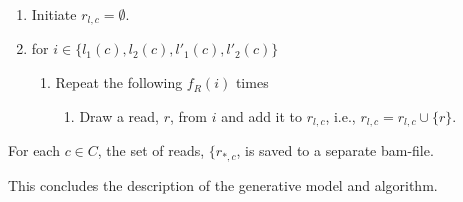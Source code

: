 \documentclass[a4paper,11pt]{article}
\begin{document}
\begin{enumerate}
\item Initiate $r_{l,c}=\emptyset$.
\item for $i\in \{l_1(c),l_2(c),l'_1(c),l'_2(c)\}$
  \begin{enumerate}
  \item Repeat the following $f_R(i)$ times
    \begin{enumerate}
    \item Draw a read, $r$, from $i$ and add it to $r_{l,c}$, i.e., $r_{l,c}=r_{l,c}\cup \{r\}$.
    \end{enumerate}
  \end{enumerate}
\end{enumerate}

For each $c\in C$, the set of reads, $\{r_{*,c}$, is saved to a separate bam-file.

This concludes the description of the generative model and algorithm.
\end{document}
